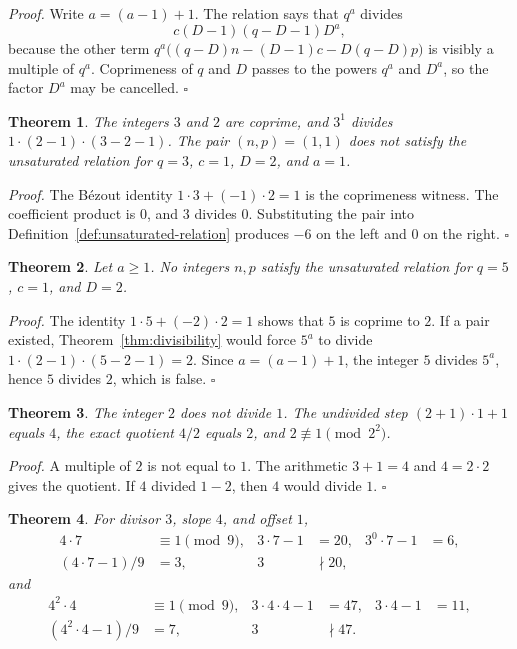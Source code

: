 \documentclass[11pt,letterpaper]{article}
\newtheorem{theorem}{Theorem}
\newenvironment{proof}{\noindent\textit{Proof.}}{\hfill\(\square\)}
\begin{document}
\begin{proof}
Write \(a=(a-1)+1\). The relation says that \(q^a\) divides
\[
c(D-1)(q-D-1)D^a,
\]
because the other term \(q^a\bigl((q-D)n-(D-1)c-D(q-D)p\bigr)\) is visibly a multiple of \(q^a\). Coprimeness of \(q\) and \(D\) passes to the powers \(q^a\) and \(D^a\), so the factor \(D^a\) may be cancelled.
\end{proof}

\begin{theorem}
\label{thm:missed-pair}
The integers \(3\) and \(2\) are coprime, and \(3^1\) divides \(1\cdot(2-1)\cdot(3-2-1)\). The pair \((n,p)=(1,1)\) does not satisfy the unsaturated relation for \(q=3\), \(c=1\), \(D=2\), and \(a=1\).
\end{theorem}

\begin{proof}
The Bézout identity \(1\cdot 3+(-1)\cdot 2=1\) is the coprimeness witness. The coefficient product is \(0\), and \(3\) divides \(0\). Substituting the pair into Definition~\ref{def:unsaturated-relation} produces \(-6\) on the left and \(0\) on the right.
\end{proof}

\begin{theorem}
\label{thm:five}
Let \(a\ge 1\). No integers \(n,p\) satisfy the unsaturated relation for \(q=5\), \(c=1\), and \(D=2\).
\end{theorem}

\begin{proof}
The identity \(1\cdot 5+(-2)\cdot 2=1\) shows that \(5\) is coprime to \(2\). If a pair existed, Theorem~\ref{thm:divisibility} would force \(5^a\) to divide \(1\cdot(2-1)\cdot(5-2-1)=2\). Since \(a=(a-1)+1\), the integer \(5\) divides \(5^a\), hence \(5\) divides \(2\), which is false.
\end{proof}

\begin{theorem}
\label{thm:undivided}
The integer \(2\) does not divide \(1\). The undivided step \((2+1)\cdot 1+1\) equals \(4\), the exact quotient \(4/2\) equals \(2\), and \(2\not\equiv 1\pmod{2^2}\).
\end{theorem}

\begin{proof}
A multiple of \(2\) is not equal to \(1\). The arithmetic \(3+1=4\) and \(4=2\cdot 2\) gives the quotient. If \(4\) divided \(1-2\), then \(4\) would divide \(1\).
\end{proof}

\begin{theorem}
\label{thm:numerals}
For divisor \(3\), slope \(4\), and offset \(1\),
\begin{align*}
4\cdot 7&\equiv 1\pmod{9},&
3\cdot 7-1&=20,&
3^0\cdot 7-1&=6,\\
(4\cdot 7-1)/9&=3,&
3&\nmid 20,
\end{align*}
and
\begin{align*}
4^2\cdot 4&\equiv 1\pmod{9},&
3\cdot 4\cdot 4-1&=47,&
3\cdot 4-1&=11,\\
(4^2\cdot 4-1)/9&=7,&
3&\nmid 47.
\end{align*}
\end{theorem}
\end{document}
